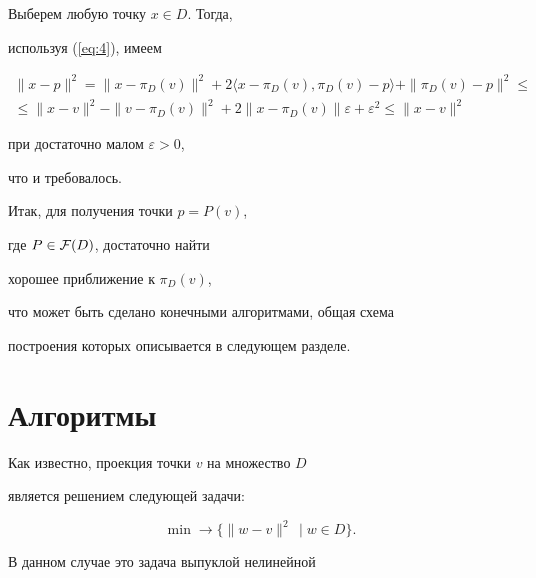 \begin{pf} Выберем любую точку $ x\in D$. Тогда,


используя (\ref{eq:4}), имеем


\begin{gather*}


 \|x -p\|^2


  =  \|x-\pi_D(v)\|^2


  + 2 \langle x -\pi_D(v), \pi_D(v)-p \rangle + \|\pi_D(v)-p\|^2\le \\


 \leq \|x-v\|^2 - \| v- \pi_D(v)\|^2


  + 2 \|x-\pi_D(v)\| \varepsilon + \varepsilon ^2 


 \leq \|x-v\|^2


\end{gather*}


при достаточно малом $\varepsilon >0$,


что и требовалось.


\end{pf}





 Итак, для получения точки $p=P(v)$,


где $ P \in {\cal F}(D)$, достаточно найти


хорошее приближение к $\pi_D(v)$,


что может быть сделано конечными алгоритмами, общая схема


построения которых описывается в следующем разделе.








\section{Алгоритмы}





 Как известно, проекция точки $v$ на множество $D$


является решением следующей задачи:


\begin{equation} \label{eq:6}


 \min \to \{ \| w-v \|^{2} \, \mid w \in D \}.


\end{equation}


В данном случае это задача выпуклой нелинейной


